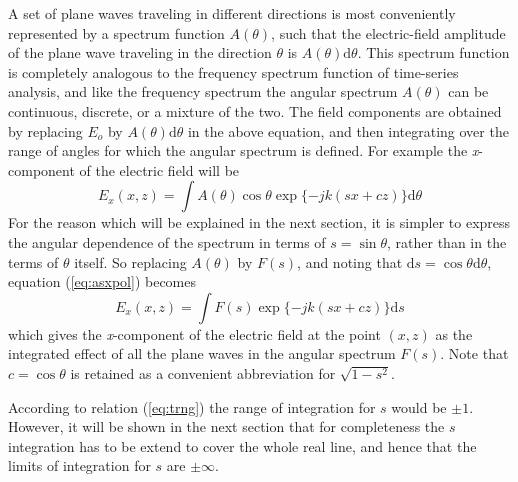 A set of plane waves traveling in different directions is most conveniently represented by a spectrum function $A(\theta)$, such that the electric-field amplitude of the plane wave traveling in the direction $\theta$ is $A(\theta)\mathrm{d}\theta$. This spectrum function is completely analogous to the frequency spectrum function of time-series analysis, and like the frequency spectrum the angular spectrum $A(\theta)$ can be continuous, discrete, or a mixture of the two. The field components are obtained by replacing $E_o$ by $A(\theta)\mathrm{d}\theta$ in the above equation, and then integrating over the range of angles for which the angular spectrum is defined. For example the \textit{x}-component of the electric field will be
\begin{equation}
E_x(x,z)=\int A(\theta)\cos\theta\exp\{-jk(sx+cz)\}\mathrm{d}\theta
\label{eq:asxpol}
\end{equation}
For the reason which will be explained in the next section, it is simpler to express the angular dependence of the spectrum in terms of $s=\sin\theta$, rather than in the terms of $\theta$ itself. So replacing $A(\theta)$ by $F(s)$, and noting that $\mathrm{d}s=\cos\theta\mathrm{d}\theta$, equation (\ref{eq:asxpol}) becomes
\begin{equation}
E_x(x,z)=\int F(s)\exp\{-jk(sx+cz)\}\mathrm{d}s
\end{equation}
which gives the \textit{x}-component of the electric field at the point $(x,z)$ as the integrated effect of all the plane waves in the angular spectrum $F(s)$. Note that $c=\cos\theta$ is retained as a convenient abbreviation for $\sqrt{1-s^2}$.

According to relation (\ref{eq:trng}) the range of integration for $s$ would be $\pm1$. However, it will be shown in the next section that for completeness the $s$ integration has to be extend to cover the whole real line, and hence that the limits of integration for $s$ are $\pm\infty$.

